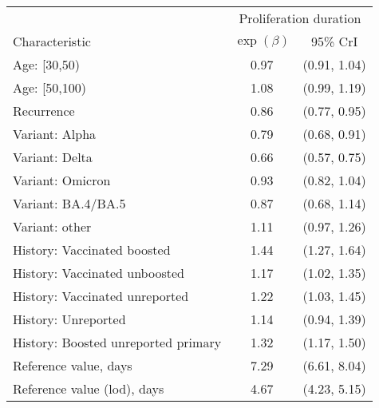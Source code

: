 \documentclass[11pt]{article}
\begin{document}
\begin{table}[p]
    \begin{table}[p]
        \centering
        \begin{tabular}{lcc}
         \toprule
         & \multicolumn{2}{c}{Proliferation duration } \\
         Characteristic & $\exp(\beta)$ & 95\% CrI\\
         \midrule
         Age: [30,50) & 0.97 & (0.91, 1.04)\\
         Age: [50,100) & 1.08 & (0.99, 1.19)\\
         Recurrence & 0.86 & (0.77, 0.95)\\
         Variant: Alpha & 0.79 & (0.68, 0.91)\\
         Variant: Delta & 0.66 & (0.57, 0.75)\\
         Variant: Omicron & 0.93 & (0.82, 1.04)\\
         Variant: BA.4/BA.5 & 0.87 & (0.68, 1.14)\\
         Variant: other & 1.11 & (0.97, 1.26)\\
         History: Vaccinated boosted & 1.44 & (1.27, 1.64)\\
         History: Vaccinated unboosted & 1.17 & (1.02, 1.35)\\
         History: Vaccinated unreported & 1.22 & (1.03, 1.45)\\
         History: Unreported & 1.14 & (0.94, 1.39)\\
         History: Boosted unreported primary & 1.32 & (1.17, 1.50)\\
         \midrule
         Reference value, days & 7.29 & (6.61, 8.04)\\
         Reference value (lod), days & 4.67 & (4.23, 5.15)\\
         \bottomrule
         \end{tabular}
 \   \end{table}


\end{table}
\end{document}
